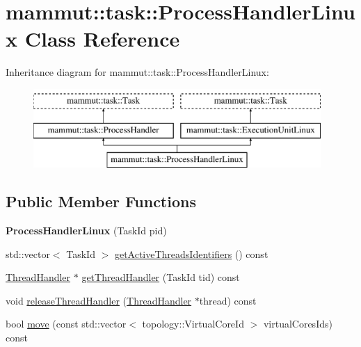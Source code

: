 \hypertarget{classmammut_1_1task_1_1ProcessHandlerLinux}{\section{mammut\-:\-:task\-:\-:Process\-Handler\-Linux Class Reference}
\label{classmammut_1_1task_1_1ProcessHandlerLinux}
}
Inheritance diagram for mammut\-:\-:task\-:\-:Process\-Handler\-Linux\-:\begin{figure}[H]
\begin{center}
\leavevmode
\includegraphics[height=3.000000cm]{classmammut_1_1task_1_1ProcessHandlerLinux}
\end{center}
\end{figure}
\subsection*{Public Member Functions}
\begin{DoxyCompactItemize}
\item 
\hypertarget{classmammut_1_1task_1_1ProcessHandlerLinux_abc9e76a8d43797d06839f29ec4b5f750}{{\bfseries Process\-Handler\-Linux} (Task\-Id pid)}\label{classmammut_1_1task_1_1ProcessHandlerLinux_abc9e76a8d43797d06839f29ec4b5f750}

\item 
std\-::vector$<$ Task\-Id $>$ \hyperlink{classmammut_1_1task_1_1ProcessHandlerLinux_a6d0d7380036a11cedec33f8e15216d2b}{get\-Active\-Threads\-Identifiers} () const 
\item 
\hyperlink{classmammut_1_1task_1_1ThreadHandler}{Thread\-Handler} $\ast$ \hyperlink{classmammut_1_1task_1_1ProcessHandlerLinux_a5cc938433da546d816a1318af40abc82}{get\-Thread\-Handler} (Task\-Id tid) const 
\item 
void \hyperlink{classmammut_1_1task_1_1ProcessHandlerLinux_abf3faf0d2aa1d28b1efd51c4759570be}{release\-Thread\-Handler} (\hyperlink{classmammut_1_1task_1_1ThreadHandler}{Thread\-Handler} $\ast$thread) const 
\item 
bool \hyperlink{classmammut_1_1task_1_1ProcessHandlerLinux_afe9e66ee6d87efd57c9bbfcc51ec0db6}{move} (const std\-::vector$<$ topology\-::\-Virtual\-Core\-Id $>$ virtual\-Cores\-Ids) const 
\end{DoxyCompactItemize}


